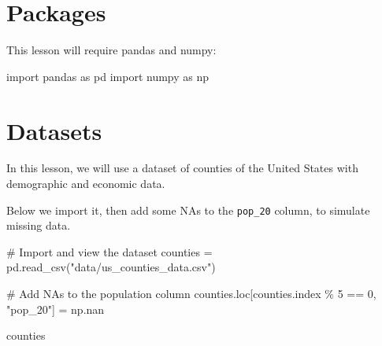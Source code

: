 \documentclass[
  letterpaper,
  DIV=11,
  numbers=noendperiod]{scrreprt}
\newenvironment{Shaded}{\begin{snugshade}}{\end{snugshade}}
\newcommand{\CommentTok}[1]{\textcolor[rgb]{0.37,0.37,0.37}{#1}}
\newcommand{\DecValTok}[1]{\textcolor[rgb]{0.68,0.00,0.00}{#1}}
\newcommand{\ImportTok}[1]{\textcolor[rgb]{0.00,0.46,0.62}{#1}}
\newcommand{\NormalTok}[1]{\textcolor[rgb]{0.00,0.23,0.31}{#1}}
\newcommand{\OperatorTok}[1]{\textcolor[rgb]{0.37,0.37,0.37}{#1}}
\newcommand{\StringTok}[1]{\textcolor[rgb]{0.13,0.47,0.30}{#1}}
\begin{document}
\section{Packages}\label{packages-1}

This lesson will require pandas and numpy:

\begin{Shaded}
\begin{Highlighting}[]
\ImportTok{import}\NormalTok{ pandas }\ImportTok{as}\NormalTok{ pd}
\ImportTok{import}\NormalTok{ numpy }\ImportTok{as}\NormalTok{ np}
\end{Highlighting}
\end{Shaded}

\section{Datasets}\label{datasets-1}

In this lesson, we will use a dataset of counties of the United States
with demographic and economic data.

Below we import it, then add some NAs to the \texttt{pop\_20} column, to
simulate missing data.

\begin{Shaded}
\begin{Highlighting}[]
\CommentTok{\# Import and view the dataset}
\NormalTok{counties }\OperatorTok{=}\NormalTok{ pd.read\_csv(}\StringTok{"data/us\_counties\_data.csv"}\NormalTok{)}

\CommentTok{\# Add NAs to the population column}
\NormalTok{counties.loc[counties.index }\OperatorTok{\%} \DecValTok{5} \OperatorTok{==} \DecValTok{0}\NormalTok{, }\StringTok{"pop\_20"}\NormalTok{] }\OperatorTok{=}\NormalTok{ np.nan}

\NormalTok{counties}
\end{Highlighting}
\end{Shaded}
\end{document}

